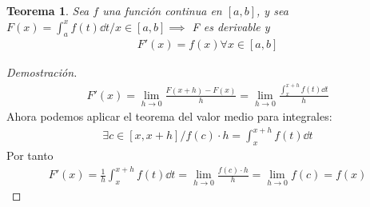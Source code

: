 \documentclass{article}
\newtheorem{theorem}{Teorema}
\begin{document}
\begin{theorem}
    Sea $f$ una función continua en $[a,b]$, y sea $F(x)= \int _{a}^x f(t) \dd{t} / x \in [a,b] \implies $ F es
    derivable y
    \begin{equation}
        \begin{split}
            F'(x)=f(x) \forall x \in [a,b]
        \end{split}
    \end{equation}
\end{theorem}
\begin{proof}[Demostración]
    \begin{equation}
        \begin{split}
            F'(x) = \lim_{h \to 0} \frac{F(x+h) - F(x)}{h} = \lim_{h \to 0} \frac{ \int _{x}^{x+h} f(t) \dd{t}}{h}
        \end{split}
    \end{equation}
    Ahora podemos aplicar el teorema del valor medio para integrales:
    \begin{equation}
        \begin{split}
            \exists c \in [x,x+h] / f(c) \cdot h = \int _{x}^{x+h}f(t) \dd{t}
        \end{split}
    \end{equation}
    Por tanto
    \begin{equation}
        \begin{split}
            F'(x)= \frac{1}{h} \int _{x}^{x+h} f(t) \dd{t} = \lim_{h \to 0} \frac{f(c) \cdot h}{h}=\lim_{h \to 0}f(c)
            =f(x)
        \end{split}
    \end{equation}
\end{proof}
\end{document}

